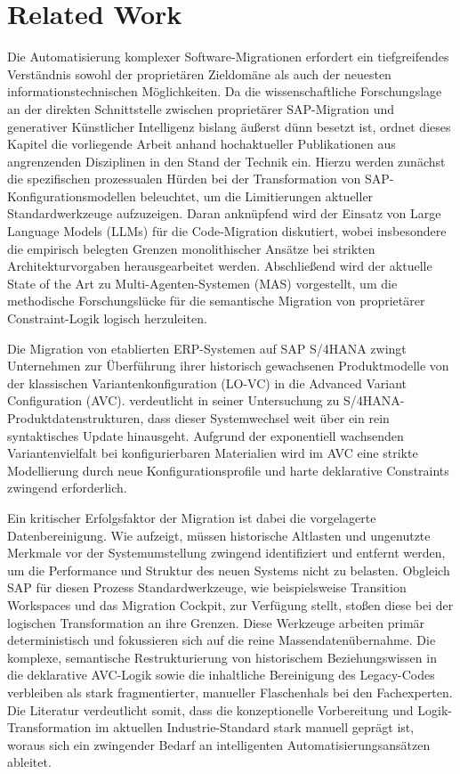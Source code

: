 \chapter{Related Work}
\label{ch:relatedwork}
Die Automatisierung komplexer Software-Migrationen erfordert ein tiefgreifendes Verständnis sowohl 
der proprietären Zieldomäne als auch der neuesten informationstechnischen Möglichkeiten. 
Da die wissenschaftliche Forschungslage an der direkten Schnittstelle zwischen proprietärer 
SAP-Migration und generativer Künstlicher Intelligenz bislang äußerst dünn besetzt ist, ordnet 
dieses Kapitel die vorliegende Arbeit anhand hochaktueller Publikationen aus angrenzenden 
Disziplinen in den Stand der Technik ein. Hierzu werden zunächst die spezifischen prozessualen 
Hürden bei der Transformation von SAP-Konfigurationsmodellen beleuchtet, um die Limitierungen 
aktueller Standardwerkzeuge aufzuzeigen. Daran anknüpfend wird der Einsatz von Large Language 
Models (LLMs) für die Code-Migration diskutiert, wobei insbesondere die empirisch belegten Grenzen 
monolithischer Ansätze bei strikten Architekturvorgaben herausgearbeitet werden. Abschließend wird 
der aktuelle State of the Art zu Multi-Agenten-Systemen (MAS) vorgestellt, um die methodische 
Forschungslücke für die semantische Migration von proprietärer Constraint-Logik logisch herzuleiten.

Die Migration von etablierten ERP-Systemen auf SAP S/4HANA zwingt Unternehmen zur Überführung ihrer 
historisch gewachsenen Produktmodelle von der klassischen Variantenkonfiguration (LO-VC) in die 
Advanced Variant Configuration (AVC). \textcite{matilainenChangeRequirementsProduct2024} verdeutlicht in seiner Untersuchung zu 
S/4HANA-Produktdatenstrukturen, dass dieser Systemwechsel weit über ein rein syntaktisches Update 
hinausgeht. Aufgrund der exponentiell wachsenden Variantenvielfalt bei konfigurierbaren Materialien 
wird im AVC eine strikte Modellierung durch neue Konfigurationsprofile und harte deklarative 
Constraints zwingend erforderlich.

Ein kritischer Erfolgsfaktor der Migration ist dabei die vorgelagerte Datenbereinigung. Wie 
\textcite{matilainenChangeRequirementsProduct2024} aufzeigt, müssen historische Altlasten und ungenutzte Merkmale vor der 
Systemumstellung zwingend identifiziert und entfernt werden, um die Performance und Struktur des 
neuen Systems nicht zu belasten. Obgleich SAP für diesen Prozess Standardwerkzeuge, wie 
beispielsweise Transition Workspaces und das Migration Cockpit, zur Verfügung stellt, stoßen diese 
bei der logischen Transformation an ihre Grenzen. Diese Werkzeuge arbeiten primär deterministisch 
und fokussieren sich auf die reine Massendatenübernahme. Die komplexe, semantische Restrukturierung 
von historischem Beziehungswissen in die deklarative AVC-Logik sowie die inhaltliche Bereinigung 
des Legacy-Codes verbleiben als stark fragmentierter, manueller Flaschenhals bei den Fachexperten. 
Die Literatur verdeutlicht somit, dass die konzeptionelle Vorbereitung und Logik-Transformation im 
aktuellen Industrie-Standard stark manuell geprägt ist, woraus sich ein zwingender Bedarf an 
intelligenten Automatisierungsansätzen ableitet.

